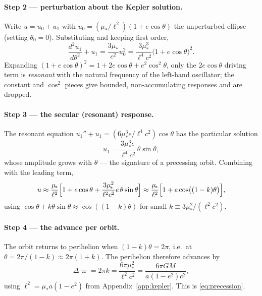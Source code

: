 \documentclass[11pt]{article}
\theoremstyle{definition}
\begin{document}
\paragraph{Step 2 --- perturbation about the Kepler solution.}
Write $u = u_0 + u_1$ with $u_0 = (\mu_{\!*}/\ell^2)(1 + e\cos\theta)$ the
unperturbed ellipse (setting $\theta_0=0$). Substituting and keeping first order,
\begin{equation}
\frac{d^2u_1}{d\theta^2} + u_1 = \frac{3\mu_{\!*}}{c^2}u_0^2
= \frac{3\mu_{\!*}^3}{\ell^4 c^2}\bigl(1 + e\cos\theta\bigr)^2.
\end{equation}
Expanding $(1+e\cos\theta)^2 = 1 + 2e\cos\theta + e^2\cos^2\theta$, only the
$2e\cos\theta$ driving term is \emph{resonant} with the natural frequency of
the left-hand oscillator; the constant and $\cos^2$ pieces give bounded,
non-accumulating responses and are dropped.

\paragraph{Step 3 --- the secular (resonant) response.}
The resonant equation $u_1'' + u_1 = (6\mu_{\!*}^3 e/\ell^4 c^2)\cos\theta$ has
the particular solution
\begin{equation}
u_1 = \frac{3\mu_{\!*}^3 e}{\ell^4 c^2}\,\theta\sin\theta,
\end{equation}
whose amplitude grows with $\theta$ --- the signature of a precessing orbit.
Combining with the leading term,
\begin{equation}
u \approx \frac{\mu_{\!*}}{\ell^2}\Bigl[1 + e\cos\theta
+ \frac{3\mu_{\!*}^2}{\ell^2 c^2}e\,\theta\sin\theta\Bigr]
\approx \frac{\mu_{\!*}}{\ell^2}\Bigl[1 + e\cos\bigl((1-k)\theta\bigr)\Bigr],
\end{equation}
using $\cos\theta + k\theta\sin\theta \approx \cos((1-k)\theta)$ for small
$k \equiv 3\mu_{\!*}^2/(\ell^2 c^2)$.

\paragraph{Step 4 --- the advance per orbit.}
The orbit returns to perihelion when $(1-k)\theta = 2\pi$, i.e.\ at
$\theta = 2\pi/(1-k) \approx 2\pi(1+k)$. The perihelion therefore advances by
\begin{equation}
\Delta\varpi = 2\pi k = \frac{6\pi\mu_{\!*}^2}{\ell^2 c^2}
= \frac{6\pi G M}{a(1-e^2)c^2},
\end{equation}
using $\ell^2 = \mu_{\!*}a(1-e^2)$ from Appendix~\ref{app:kepler}. This is
\eqref{eq:precession}.
\end{document}

